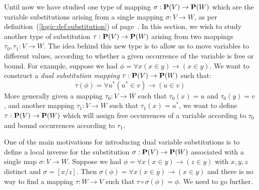 Until now we have studied one type of mapping $\sigma:\mbox{${\bf P}(V)$}\to{\bf
P}(W)$ which are the variable substitutions arising from a single
mapping $\sigma:V\to W$, as per
definition~(\ref{logic:def:substitution}) of
page~\pageref{logic:def:substitution}. In this section, we wish to
study another type of substitution $\tau:\mbox{${\bf P}(V)$}\to{\bf P}(W)$ arising
from two mappings $\tau_{0},\tau_{1}:V\to W$. The idea behind this
new type is to allow us to move variables to different values,
according to whether a given occurrence of the variable  is free or
bound. For example, suppose we had $\phi=\forall x(x\in y)\to(x\in
y)$. We want to construct a {\em dual substitution mapping}
$\tau:\mbox{${\bf P}(V)$}\to{\bf P}(W)$ such that:
    \[
    \tau(\phi)=\forall u^{*}(u^{*}\in v)\to(u\in v)
    \]
More generally given a mapping $\tau_{0}:V\to W$ such that
$\tau_{0}(x)=u$ and $\tau_{0}(y)=v$, and another mapping
$\tau_{1}:V\to W$ such that $\tau_{1}(x)=u^{*}$, we want to define
$\tau:\mbox{${\bf P}(V)$}\to{\bf P}(W)$ which will assign free occurrences of a
variable according to $\tau_{0}$ and bound occurrences according to
$\tau_{1}$.

One of the main motivations for introducing dual variable
substitutions is to define a local inverse for the substitution
$\sigma:\mbox{${\bf P}(V)$}\to{\bf P}(W)$ associated with a single map $\sigma:V\to
W$. Suppose we had $\phi=\forall x(x\in y)\to(z\in y)$ with $x,y,z$
distinct and $\sigma=[x/z]$. Then $\sigma(\phi)=\forall x(x\in
y)\to(x\in y)$ and there is no way to find a mapping $\tau:W\to V$
such that $\tau\circ\sigma(\phi)=\phi$. We need to go further.

